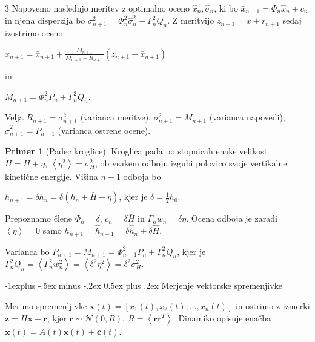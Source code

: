 \documentclass[10pt,landscape]{article}
\makeatletter
\renewcommand{\subsection}{\@startsection{subsection}{2}{0mm}%
	{-1explus -.5ex minus -.2ex}%
	{0.5ex plus .2ex}%
	{\normalfont\normalsize\bfseries}}
\theoremstyle{definition}
\newtheorem*{primer}{Primer}
\makeatother
\begin{document}
\begin{multicols}{3}
Napovemo naslednjo meritev z optimalno oceno \( \hat{x}_n, \hat{\sigma}_n \), ki bo \( \bar{x}_{n + 1} = \Phi_n \hat{x}_n + c_n \) in njena disperzija bo \( \bar{\sigma}_{n + 1} ^2 = \Phi_n ^2 \hat{\sigma}_n ^2 + \Gamma_n ^2 Q_n \). Z meritvijo \( z_{n + 1} = x + r_{n + 1} \) sedaj izostrimo oceno

\( \hat{x}_{n + 1} = \bar{x}_{n + 1} + \frac{M_{n + 1}}{M_{n + 1} + R_{n + 1}} \left( z_{n + 1} - \bar{x}_{n + 1} \right) \)

in

\( M_{n + 1} = \Phi_n ^2 P_n + \Gamma_n ^2 Q_n.\)

Velja \( R_{n + 1} = \sigma_{n + 1} ^2 \) (varianca meritve), \( \bar{\sigma}_{n + 1} ^2 = M_{n + 1} \) (varianca napovedi), \( \hat{\sigma}_{n + 1} ^2 = P_{n + 1} \) (varianca ostrene ocene).

\begin{primer}[Padec kroglice]
  Kroglica pada po stopnicah enake velikost \( H = \bar{H} + \eta, \ \left\langle \eta ^2 \right\rangle = \sigma_H ^2 \), ob vsakem odboju izgubi polovico svoje vertikalne kinetične energije. Višina \( n + 1 \) odboja bo

  \( h_{n + 1} = \delta h_n = \delta \left( h_n + \bar{H} + \eta  \right)    \), kjer je \( \delta = \frac{1}{2} h_0 \).

  Prepoznamo člene \( \Phi_n = \delta \), \( c_n = \delta \bar{H} \) in \( \Gamma_n w_n = \delta \eta \). Ocena odboja je zaradi \( \left\langle \eta \right\rangle = 0 \) samo \( \bar{h}_{n + 1} = \hat{h}_{n + 1} = \delta \hat{h}_n + \delta \hat{H} \).

  Varianca bo \( P_{n + 1} = M_{n + 1} = \Phi_{n + 1} ^2 P_n + \Gamma_n ^2 Q_n \), kjer je \( \Gamma_n ^2 Q_n = \left\langle \Gamma_n ^2 w_n ^2 \right\rangle = \left\langle \delta ^2 \eta ^2 \right\rangle = \delta ^2 \sigma_H ^2 \).
\end{primer}

\subsection{Merjenje vektorske spremenjivke}

Merimo spremenljivke \( \mathbf{x}(t) = \left[ x_1 (t), x_2 (t), \ldots, x_n (t) \right] \) in ostrimo z izmerki \( \mathbf{z} = H \mathbf{x} + \mathbf{r} \), kjer \( \mathbf{r} \sim \mathcal{N} (0, R), \ R = \left\langle \mathbf{r} \mathbf{r}^T \right\rangle \). Dinamiko opisuje enačba \( \dot{\mathbf{x}} (t) = A(t) \mathbf{x}(t) + \mathbf{c}(t) \).


\end{multicols}
\end{document}
